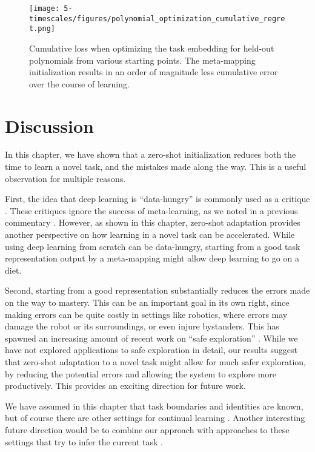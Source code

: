 \begin{figure}
\centering
\texttt{[image: 5-timescales/figures/polynomial\_optimization\_cumulative\_regret.png]}
\caption[Cumulative loss when optimizing the task embedding for held-out polynomials from various starting points.]{Cumulative loss when optimizing the task embedding for held-out polynomials from various starting points. The meta-mapping initialization results in an order of magnitude less cumulative error over the course of learning.} \label{fig:timescales_polynomial_optimization_regret}
\end{figure}

\section{Discussion}
In this chapter, we have shown that a zero-shot initialization reduces both the time to learn a novel task, and the mistakes made along the way. This is a useful observation for multiple reasons. \par 
First, the idea that deep learning is ``data-hungry'' is commonly used as a critique \citep[e.g.]{Lake2016, Marcus2018}. These critiques ignore the success of meta-learning, as we noted in a previous commentary \citep{Hansen2017}. However, as shown in this chapter, zero-shot adaptation provides another perspective on how learning in a novel task can be accelerated. While using deep learning from scratch can be data-hungry, starting from a good task representation output by a meta-mapping might allow deep learning to go on a diet. \par  
Second, starting from a good representation substantially reduces the errors made on the way to mastery. This can be an important goal in its own right, since making errors can be quite costly in settings like robotics, where errors may damage the robot or its surroundings, or even injure bystanders. This has spawned an increasing amount of recent work on ``safe exploration'' \citep[e.g.][]{Turchetta2016, Turchetta2019}. While we have not explored applications to safe exploration in detail, our results suggest that zero-shot adaptation to a novel task might allow for much safer exploration, by reducing the potential errors and allowing the system to explore more productively. This provides an exciting direction for future work. \par  
We have assumed in this chapter that task boundaries and identities are known, but of course there are other settings for continual learning \citep{Ven2018}. Another interesting future direction would be to combine our approach with approaches to these settings that try to infer the current task \citep[e.g][]{Nagabandi2019}. \par
